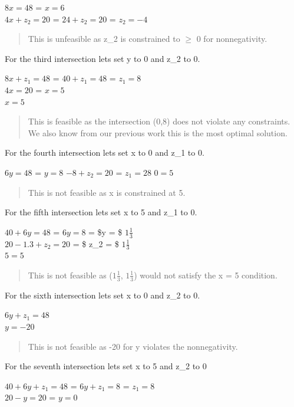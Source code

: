 \documentclass[]{article}
\begin{document}
\(8x = 48\) = \(x = 6\)\\
\(4x + z_2 = 20\) = \(24 + z _2 = 20\) = \(z_2 = -4\)

\begin{quote}
This is unfeasible as z\_2 is constrained to \(\geq\) 0 for
nonnegativity.
\end{quote}

For the third intersection lets set y to 0 and z\_2 to 0.

\(8x + z_1 = 48\) = \(40 + z_1 = 48\) = \(z_1 = 8\)\\
\(4x = 20\) = \(x = 5\)\\
\(x = 5\)

\begin{quote}
This is feasible as the intersection (0,8) does not violate any
constraints. We also know from our previous work this is the most
optimal solution.
\end{quote}

For the fourth intersection lets set x to 0 and z\_1 to 0.

\(6y = 48\) = \(y = 8\) \(-8 + z_2 = 20\) = \(z_1 = 28\) \(0 = 5\)

\begin{quote}
This is not feasible as x is constrained at 5.
\end{quote}

For the fifth intersection lets set x to 5 and z\_1 to 0.

\(40 + 6y = 48\) = \(6y = 8\) = \$y = \$ \(1\frac{1}{3}\)\\
\(20 - 1.3 + z_2 = 20\) = \$ z\_2 = \$ \(1\frac{1}{3}\)\\
\(5 = 5\)

\begin{quote}
This is not feasible as (\(1\frac{1}{3}\), \(1\frac{1}{3}\)) would not
satisfy the x = 5 condition.
\end{quote}

For the sixth intersection lets set x to 0 and z\_2 to 0.

\(6y + z_1 = 48\)\\
\(y = -20\)

\begin{quote}
This is not feasible as -20 for y violates the nonnegativity.
\end{quote}

For the seventh intersection lets set x to 5 and z\_2 to 0

\(40 + 6y + z_1 = 48\) = \(6y + z_1 = 8\) = \(z_1 = 8\)\\
\(20 - y = 20\) = \(y = 0\)
\end{document}
